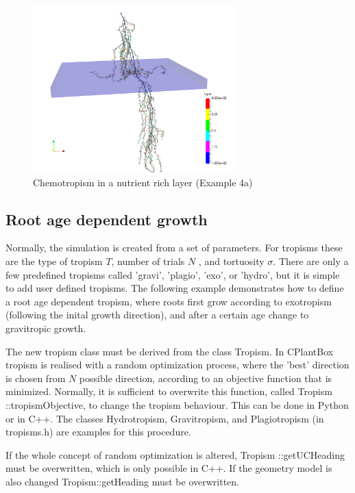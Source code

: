 \begin{figure}
\centering
\includegraphics[width=0.7\textwidth]{example4a.png}
\caption{Chemotropism in a nutrient rich layer (Example 4a)} \label{fig:chemo}
\end{figure}



\subsection{Root age dependent growth} \label{sec:usertropism}

Normally, the simulation is created from a set of parameters. For tropisms these are the type of tropism $T$, number of trials $N$ , and tortuosity $\sigma$. There are only a few predefined tropisms called 'gravi', 'plagio', 'exo', or 'hydro', but it is simple to add user defined tropisms.
The following example demonstrates how to define a root age dependent tropism, where roots first grow according to exotropism (following the inital growth direction), and after a certain age change to gravitropic growth.

The new tropism class must be derived from the class Tropism. In CPlantBox tropism is realised with a random optimization process, where the 'best' direction is chosen from $N$ possible direction, according to an objective function that is minimized. Normally, it is sufficient to overwrite this function, called Tropism ::tropismObjective, to change the tropism behaviour. This can be done in Python or in C++. The classes Hydrotropism, Gravitropism, and Plagiotropism (in tropisms.h) are examples for this procedure.

If the whole concept of random optimization is altered, Tropism ::getUCHeading must be overwritten, which is only possible in C++. If the geometry model is also changed Tropism::getHeading must be overwritten.

